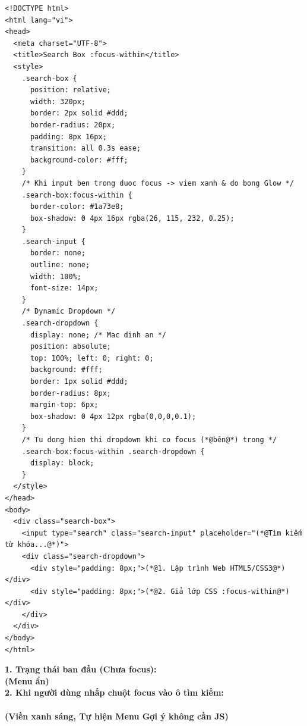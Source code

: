 \documentclass[11pt,oneside]{book}
\begin{document}
\begin{codeWindow}
\begin{lstlisting}[language=HTML5]
<!DOCTYPE html>
<html lang="vi">
<head>
  <meta charset="UTF-8">
  <title>Search Box :focus-within</title>
  <style>
    .search-box {
      position: relative;
      width: 320px;
      border: 2px solid #ddd;
      border-radius: 20px;
      padding: 8px 16px;
      transition: all 0.3s ease;
      background-color: #fff;
    }
    /* Khi input ben trong duoc focus -> viem xanh & do bong Glow */
    .search-box:focus-within {
      border-color: #1a73e8;
      box-shadow: 0 4px 16px rgba(26, 115, 232, 0.25);
    }
    .search-input {
      border: none;
      outline: none;
      width: 100%;
      font-size: 14px;
    }
    /* Dynamic Dropdown */
    .search-dropdown {
      display: none; /* Mac dinh an */
      position: absolute;
      top: 100%; left: 0; right: 0;
      background: #fff;
      border: 1px solid #ddd;
      border-radius: 8px;
      margin-top: 6px;
      box-shadow: 0 4px 12px rgba(0,0,0,0.1);
    }
    /* Tu dong hien thi dropdown khi co focus (*@bên@*) trong */
    .search-box:focus-within .search-dropdown {
      display: block;
    }
  </style>
</head>
<body>
  <div class="search-box">
    <input type="search" class="search-input" placeholder="(*@Tìm kiếm từ khóa...@*)">
    <div class="search-dropdown">
      <div style="padding: 8px;">(*@1. Lập trình Web HTML5/CSS3@*)</div>
      <div style="padding: 8px;">(*@2. Giả lớp CSS :focus-within@*)</div>
    </div>
  </div>
</body>
</html>
\end{lstlisting}
\end{codeWindow}

\begin{browserWindow}
\sffamily\small
\textbf{1. Trạng thái ban đầu (Chưa focus):}\\[2pt]
 \quad \textcolor{gray!70}{\bfseries (Menu ẩn)}\\[8pt]
\textbf{2. Khi người dùng nhấp chuột focus vào ô tìm kiếm:}\\[2pt]
\\[-4pt]
 \quad \textcolor{primaryBlue}{\bfseries (Viền xanh sáng, Tự hiện Menu Gợi ý không cần JS)}
\end{browserWindow}
\end{document}
